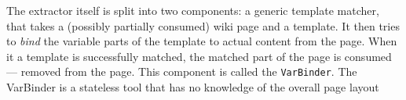 The extractor itself is split into two components: a generic template matcher, that takes a (possibly partially consumed) wiki page and a template. It then tries to \textit{bind} the variable parts of the template to actual content from the page. When it a template is successfully matched, the matched part of the page is consumed --- removed from the page. This component is called the \texttt{VarBinder}. The VarBinder is a stateless tool that has no knowledge of the overall page layout 
\vfill
\newpage
